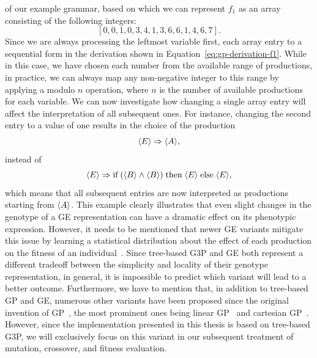 of our example grammar, based on which we can represent $f_1$ as an array consisting of the following integers:
\begin{equation*}
	\left[ 0, 0, 1, 0, 3, 4, 1, 3, 6, 6, 1, 4, 6, 7 \right].
\end{equation*}
Since we are always processing the leftmost variable first, each array entry to a sequential form in the derivation shown in Equation~\eqref{eq:gp-derivation-f1}.
While in this case, we have chosen each number from the available range of productions, in practice, we can always map any non-negative integer to this range by applying a modulo $n$ operation, where $n$ is the number of available productions for each variable.
We can now investigate how changing a single array entry will affect the interpretation of all subsequent ones.
For instance, changing the second entry to a value of one results in the choice of the production 
\begin{equation*}
	\langle E \rangle \Rightarrow \langle A \rangle,
\end{equation*}
instead of
\begin{equation*}
	\langle E \rangle \Rightarrow \text{if} \; (\langle B \rangle \wedge \langle B \rangle) \; \text{then} \; \langle E \rangle \; \text{else} \; \langle E \rangle,
\end{equation*}
which means that all subsequent entries are now interpreted as productions starting from $\langle A \rangle$.
This example clearly illustrates that even slight changes in the genotype of a GE representation can have a dramatic effect on its phenotypic expression.
However, it needs to be mentioned that newer GE variants mitigate this issue by learning a statistical distribution about the effect of each production on the fitness of an individual~\cite{zz_ge1,zz_ge2}.
Since tree-based G3P and GE both represent a different tradeoff between the simplicity and locality of their genotype representation, in general, it is impossible to predict which variant will lead to a better outcome.
Furthermore, we have to mention that, in addition to tree-based GP and GE, numerous other variants have been proposed since the original invention of GP~\cite{poli2008field}, the most prominent ones being linear GP~\cite{brameier2007linear} and cartesian GP~\cite{miller2008cartesian}. 
However, since the implementation presented in this thesis is based on tree-based G3P, we will exclusively focus on this variant in our subsequent treatment of mutation, crossover, and fitness evaluation.
